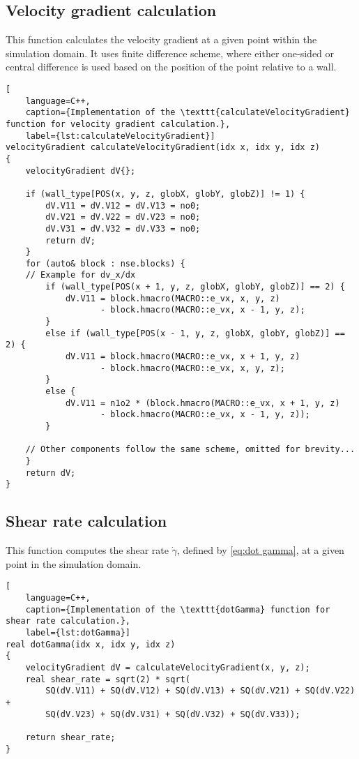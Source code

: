 \subsection*{Velocity gradient calculation}
This function calculates the velocity gradient at a given point within the simulation domain. It uses finite difference scheme, where either one-sided or central difference is used based on the position of the point relative to a wall.
\begin{lstlisting}[
	language=C++,
	caption={Implementation of the \texttt{calculateVelocityGradient} function for velocity gradient calculation.},
	label={lst:calculateVelocityGradient}]
velocityGradient calculateVelocityGradient(idx x, idx y, idx z)
{
	velocityGradient dV{};
	
	if (wall_type[POS(x, y, z, globX, globY, globZ)] != 1) {
		dV.V11 = dV.V12 = dV.V13 = no0;
		dV.V21 = dV.V22 = dV.V23 = no0;
		dV.V31 = dV.V32 = dV.V33 = no0;
		return dV;
	}
	for (auto& block : nse.blocks) {
	// Example for dv_x/dx
		if (wall_type[POS(x + 1, y, z, globX, globY, globZ)] == 2) {
			dV.V11 = block.hmacro(MACRO::e_vx, x, y, z) 
				   - block.hmacro(MACRO::e_vx, x - 1, y, z);
		}
		else if (wall_type[POS(x - 1, y, z, globX, globY, globZ)] == 2) {
			dV.V11 = block.hmacro(MACRO::e_vx, x + 1, y, z) 
				   - block.hmacro(MACRO::e_vx, x, y, z);
		}
		else {
			dV.V11 = n1o2 * (block.hmacro(MACRO::e_vx, x + 1, y, z)
				   - block.hmacro(MACRO::e_vx, x - 1, y, z));
		}
	
	// Other components follow the same scheme, omitted for brevity...
	}
	return dV;
}
\end{lstlisting}

\subsection*{Shear rate calculation}
This function computes the shear rate $\dot{\gamma}$, defined by \eqref{eq:dot gamma}, at a given point in the simulation domain.
\begin{lstlisting}[
	language=C++,
	caption={Implementation of the \texttt{dotGamma} function for shear rate calculation.},
	label={lst:dotGamma}]
real dotGamma(idx x, idx y, idx z)
{
	velocityGradient dV = calculateVelocityGradient(x, y, z);
	real shear_rate = sqrt(2) * sqrt(
		SQ(dV.V11) + SQ(dV.V12) + SQ(dV.V13) + SQ(dV.V21) + SQ(dV.V22) +
	    SQ(dV.V23) + SQ(dV.V31) + SQ(dV.V32) + SQ(dV.V33));

	return shear_rate;
}
\end{lstlisting}

